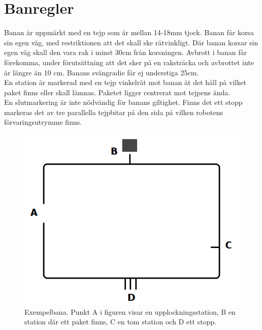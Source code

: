 \section{Banregler} \label{banregler}

Banan är uppmärkt med en tejp som är mellan 14-18mm tjock. Banan får korsa sin egen väg, med restriktionen att det skall ske rätvinkligt. Där banan korsar sin egen väg skall den vara rak i minst 30cm från korsningen. Avbrott i banan får förekomma, under förutsättning att det sker på en raksträcka och avbrottet inte är längre än 10 cm. Banans svängradie får ej understiga 25cm. \\
En station är markerad med en tejp vinkelrät mot banan åt det håll på vilket paket finns eller skall lämnas. Paketet ligger centrerat mot tejpens ända. \\
En slutmarkering är inte nödvändig för banans giltighet. Finns det ett stopp markeras det av tre parallella tejpbitar på den sida på vilken robotens förvaringsutrymme finns. \\

\begin{figure}[h]
\center
\includegraphics[scale=0.6]{figur.png}
\endcenter
\caption{Exempelbana. Punkt A i figuren visar en upplockningsstation, B en station där ett paket finns, C en tom station och D ett stopp.}
\end{figure}